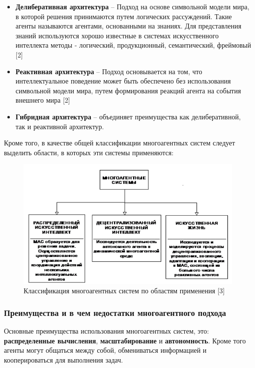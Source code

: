 \documentclass[14pt,a4paper,report]{report}
\begin{document}
\begin{itemize}
	\item \textbf{Делиберативная архитектура} -- Подход на основе символьной модели мира, в которой решения принимаются путем логических рассуждений. Такие агенты называются агентами, основанными на знаниях. Для представления знаний используются хорошо известные в системах искусственного интеллекта методы - логический, продукционный, семантический, фреймовый [2]
	\item \textbf{Реактивная архитектура} -- Подход основывается на том, что интеллектуальное поведение может быть обеспечено без использования символьной модели мира, путем формирования реакций агента на события внешнего мира [2]
	\item \textbf{Гибридная архитектура} -- объединяет преимущества как делиберативной, так и реактивной архитектур.
\end{itemize}

Кроме того, в качестве общей классификации многоагентных систем следует выделить области, в которых эти системы применяются:

\begin{figure}[h!]
	\centering
	\includegraphics[scale = 0.57]{images/0_0.png}
	\caption{Классификация многоагентных систем по областям применения [3]}
\end{figure}

\subsubsection{Преимущества и в чем недостатки многоагентного подхода}

Основные преимущества использования многоагентных систем, это: \textbf{распределенные вычисления}, \textbf{масштабирование} и \textbf{автономность}. Кроме того агенты могут общаться между собой, обмениваться информацией и кооперироваться для выполнения задач.
\end{document}
